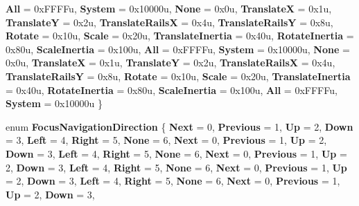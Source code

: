 \begin{DoxyCompactItemize}
{\bfseries All} = 0x\+F\+F\+F\+Fu, 
{\bfseries System} = 0x10000u, 
\newline
{\bfseries None} = 0x0u, 
{\bfseries TranslateX} = 0x1u, 
{\bfseries TranslateY} = 0x2u, 
{\bfseries Translate\+RailsX} = 0x4u, 
\newline
{\bfseries Translate\+RailsY} = 0x8u, 
{\bfseries Rotate} = 0x10u, 
{\bfseries Scale} = 0x20u, 
{\bfseries Translate\+Inertia} = 0x40u, 
\newline
{\bfseries Rotate\+Inertia} = 0x80u, 
{\bfseries Scale\+Inertia} = 0x100u, 
{\bfseries All} = 0x\+F\+F\+F\+Fu, 
{\bfseries System} = 0x10000u, 
\newline
{\bfseries None} = 0x0u, 
{\bfseries TranslateX} = 0x1u, 
{\bfseries TranslateY} = 0x2u, 
{\bfseries Translate\+RailsX} = 0x4u, 
\newline
{\bfseries Translate\+RailsY} = 0x8u, 
{\bfseries Rotate} = 0x10u, 
{\bfseries Scale} = 0x20u, 
{\bfseries Translate\+Inertia} = 0x40u, 
\newline
{\bfseries Rotate\+Inertia} = 0x80u, 
{\bfseries Scale\+Inertia} = 0x100u, 
{\bfseries All} = 0x\+F\+F\+F\+Fu, 
{\bfseries System} = 0x10000u
 \}
\item 
\mbox{\label{namespace_windows_1_1_u_i_1_1_xaml_1_1_input_a79a24b7b4f6dcfda601ea71a4020fd05}} 
enum {\bfseries Focus\+Navigation\+Direction} \{ \newline
{\bfseries Next} = 0, 
{\bfseries Previous} = 1, 
{\bfseries Up} = 2, 
{\bfseries Down} = 3, 
\newline
{\bfseries Left} = 4, 
{\bfseries Right} = 5, 
{\bfseries None} = 6, 
{\bfseries Next} = 0, 
\newline
{\bfseries Previous} = 1, 
{\bfseries Up} = 2, 
{\bfseries Down} = 3, 
{\bfseries Left} = 4, 
\newline
{\bfseries Right} = 5, 
{\bfseries None} = 6, 
{\bfseries Next} = 0, 
{\bfseries Previous} = 1, 
\newline
{\bfseries Up} = 2, 
{\bfseries Down} = 3, 
{\bfseries Left} = 4, 
{\bfseries Right} = 5, 
\newline
{\bfseries None} = 6, 
{\bfseries Next} = 0, 
{\bfseries Previous} = 1, 
{\bfseries Up} = 2, 
\newline
{\bfseries Down} = 3, 
{\bfseries Left} = 4, 
{\bfseries Right} = 5, 
{\bfseries None} = 6, 
\newline
{\bfseries Next} = 0, 
{\bfseries Previous} = 1, 
{\bfseries Up} = 2, 
{\bfseries Down} = 3, 

\end{DoxyCompactItemize}
